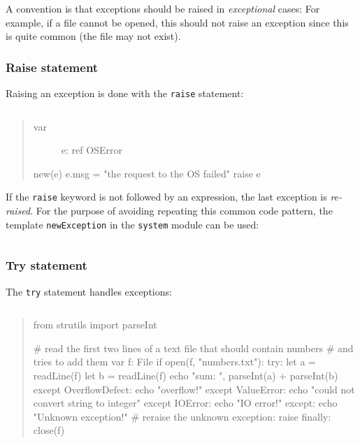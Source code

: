 A convention is that exceptions should be raised in \emph{exceptional}
cases: For example, if a file cannot be opened, this should not raise an
exception since this is quite common (the file may not exist).

\hypertarget{raise-statement}{%
\subsubsection{Raise statement}\label{raise-statement}}

Raising an exception is done with the \texttt{raise} statement:

\begin{verbatim}
\end{verbatim}

\begin{quote}
\begin{description}
\item[var]
e: ref OSError
\end{description}

new(e) e.msg = "the request to the OS failed" raise e
\end{quote}

If the \texttt{raise} keyword is not followed by an expression, the last
exception is \emph{re-raised}. For the purpose of avoiding repeating
this common code pattern, the template \texttt{newException} in the
\texttt{system} module can be used:

\begin{verbatim}
\end{verbatim}

\hypertarget{try-statement}{%
\subsubsection{Try statement}\label{try-statement}}

The \texttt{try} statement handles exceptions:

\begin{verbatim}
\end{verbatim}

\begin{quote}
from strutils import parseInt

\# read the first two lines of a text file that should contain numbers
\# and tries to add them var f: File if open(f, "numbers.txt"): try: let
a = readLine(f) let b = readLine(f) echo "sum: ", parseInt(a) +
parseInt(b) except OverflowDefect: echo "overflow!" except ValueError:
echo "could not convert string to integer" except IOError: echo "IO
error!" except: echo "Unknown exception!" \# reraise the unknown
exception: raise finally: close(f)
\end{quote}

